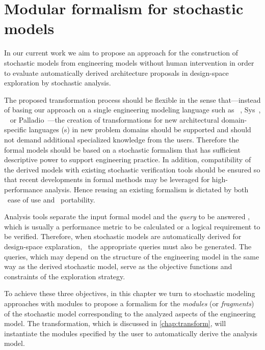 \chapter{Modular formalism for stochastic models}
\label{chap:rgspn}

In our current work we aim to propose an approach for the construction of stochastic models from engineering models without human intervention in order to evaluate automatically derived architecture proposals in design-space exploration by stochastic analysis.

The proposed transformation process should be flexible in the sense that---instead of basing our approach on a single engineering modeling language such as ~\citep{Rumbaugh04uml}, Sys~\citep{Friedenthal16sysml}, ~\citep{Feiler12aadl} or Palladio~\citep{Becker08palladio}---the creation of transformations for new architectural domain-specific languages (s) in new problem domains should be supported and should not demand additional specialized knowledge from the users. Therefore the formal models should be based on a stochastic formalism that has sufficient descriptive power to support engineering practice. In addition, compatibility of the derived models with existing stochastic verification tools should be ensured so that recent developments in formal methods may be leveraged for high-performance analysis. Hence reusing an existing formalism is dictated by both ~ease of use and ~portability.

Analysis tools separate the input formal model and the \emph{query} to be answered , which is usually a performance metric to be calculated or a logical requirement to be verified. Therefore, when stochastic models are automatically derived for design-space explaration, ~the appropriate queries must also be generated. The queries, which may depend on the structure of the engineering model in the same way as the derived stochastic model, serve as the objective functions and constraints of the exploration strategy.

To achieve these three objectives, in this chapter we turn to stochastic modeling approaches with modules to propose a formalism for the \emph{modules} (or \emph{fragments}) of the stochastic model corresponding to the analyzed aspects of the engineering model. The transformation, which is discussed in \cref{chap:transform}, will instantiate the modules specified by the user to automatically derive the analysis model.

